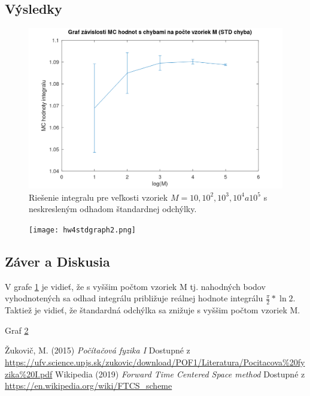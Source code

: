 \documentclass{article}
\theoremstyle{definition}
\theoremstyle{remark}
\begin{document}
\subsection{Výsledky}


\begin{figure}[H]
    \centering
    \includegraphics[width=1\textwidth]{hw4stdgraph.png}
    \caption{Riešenie integralu pre veľkosti vzoriek $M = 10, 10^2, 10^3, 10^4 a 10^5$ s neskresleným odhadom štandardnej odchýlky.}
    \label{fig:mc}
\end{figure}

\begin{figure}
    \centering

    \texttt{[image: hw4stdgraph2.png]}
    \label{second}
\end{figure}


\subsection{Záver a Diskusia}
V grafe \ref{fig:mc} je vidieť, že s vyššim počtom vzoriek M tj. nahodných bodov vyhodnotených sa odhad integrálu približuje reálnej hodnote integrálu $\frac{\pi}{2} * \ln{2}$. Taktiež je vidieť, že štandardná odchýlka sa znižuje s vyššim počtom vzoriek M.   

Graf \ref{second}


\begin{thebibliography}{99}

Žukovič, M. (2015) \emph{Počítačová fyzika I} Dostupné z \url{https://ufv.science.upjs.sk/zukovic/download/POF1/Literatura/Pocitacova%20fyzika%20I.pdf}
 Wikipedia (2019) \emph{Forward Time Centered Space method} Dostupné z \url{https://en.wikipedia.org/wiki/FTCS_scheme}
\end{thebibliography}
\end{document}
